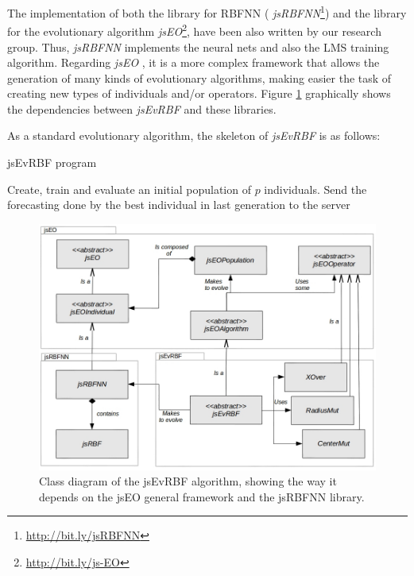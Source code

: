\documentclass{article}
\begin{document}
The implementation of both the library for RBFNN ( {\em
  jsRBFNN}\footnote{\url{http://bit.ly/jsRBFNN}}) and the library for the evolutionary algorithm  {\em
  jsEO}\footnote{\url{http://bit.ly/js-EO}}, have been also written by
our research group. Thus, {\em jsRBFNN} implements the neural nets and also the LMS
training algorithm. %
Regarding  {\em jsEO} \cite{EvoStar2014:jsEO}, it is a more
complex framework that allows the generation of many kinds of
evolutionary algorithms, making easier the task of creating new types
of individuals and/or operators. Figure \ref{fig:class_diagram}
graphically shows the dependencies between {\em jsEvRBF} and these
libraries.


As a standard evolutionary algorithm, the skeleton of {\em jsEvRBF} is
as follows:

\begin{algorithm}
\caption{jsEvRBF program}
\begin{algorithmic}
\STATE Create, train and evaluate an initial population of $p$ individuals.
\ENDFOR
\STATE Send the forecasting done by the best individual in last generation to the server
\end{algorithmic}
\end{algorithm}

\begin{figure}[!ht]
\includegraphics[width=120mm]{class-diagram.jpg}
\caption{Class diagram of the jsEvRBF algorithm, showing the way it depends on the jsEO general framework and the jsRBFNN library.}
\label{fig:class_diagram} %
\end{figure}
\end{document}
